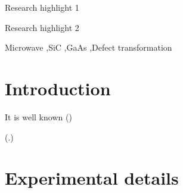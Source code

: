 \documentclass[final,3p,times,twocolumn,authoryear]{elsarticle}
\begin{document}
\begin{frontmatter}

\begin{highlights}
\item Research highlight 1
\item Research highlight 2
\end{highlights}

\begin{keyword}
Microwave
\sep SiC
\sep GaAs
\sep Defect transformation
\end{keyword}

\end{frontmatter}


\section{Introduction}\label{sec1}



It is well known (\cite{KozlovsEn,RadiationEffectsBook})

(\cite{MW:Rev,ZOHM2000,BHUNIA1998,Bacherikov2003En,Pashkov1994En,
BoltovetsEn,Milenin1994En,BelyaevIntac,ASHKINADZE1996,ProcSPIE,Belyaev1998JTFEn,
Bacherikov2008En,Konakova2015En,Konakova2012FTPEn}.)


 \cite{MW:Rev,ZOHM2000}

\cite{MW:Rev}

\cite{MW:Rev,BHUNIA1998}

\cite{BoltovetsEn,Pashkov1994En,Milenin1994En,BelyaevIntac,ProcSPIE,Konakova2015En,Konakova2012FTPEn}

\cite{Bacherikov2003En}

\cite{Bacherikov2003En,Belyaev1998JTFEn,Konakova2015En}

\cite{Milenin1994En}

\cite{Belyaev1998JTFEn}

\cite{Bacherikov2008En}

\cite{BelyaevIntac,ProcSPIE,Belyaev1998JTFEn}


\section{Experimental details}\label{sec2}

\cite{BoltovetsEn,Milenin1994En,BelyaevIntac,ASHKINADZE1996,ProcSPIE}
\end{document}

